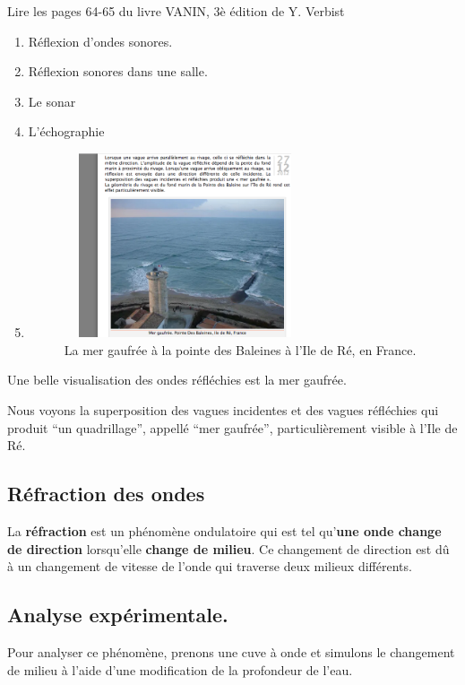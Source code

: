 Lire les pages 64-65 du livre VANIN, 3è édition de Y. Verbist
\begin{enumerate}
 \item Réflexion d'ondes sonores.
 \item Réflexion sonores dans une salle.
 \item Le sonar
 \item L'échographie
 \item
\begin{figure}
\centering
\includegraphics[width=7.13cm,height=5.433cm]{Pictures/100000010000024A000001FB96EDB4A31FE3EFC8.png}
\caption{La mer gaufrée à la pointe des Baleines à l'Ile de Ré, en France.}
\end{figure}
\end{enumerate}

Une belle visualisation des ondes réfléchies est la mer gaufrée.

Nous voyons la superposition des vagues incidentes et des vagues
réfléchies qui produit ``un quadrillage'', appellé ``mer gaufrée'',
particulièrement visible à l'Ile de Ré.

\subsection{Réfraction des ondes} %

La \textbf{réfraction} est un phénomène ondulatoire qui est tel
qu'\textbf{une onde change de direction }lorsqu'elle \textbf{change de
milieu}. Ce changement de direction est dû à un changement de vitesse de
l'onde qui traverse deux milieux différents.

\subsection*{Analyse expérimentale. }

Pour analyser ce phénomène, prenons une cuve à onde et simulons le
changement de milieu à l'aide d'une modification de la profondeur de
l'eau.

